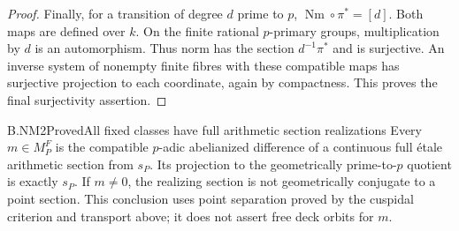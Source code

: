 \begin{proof}
Finally, for a transition of degree $d$ prime to $p$,
$\operatorname{Nm}\circ\pi^*=[d]$. Both maps are defined over
$k$. On the finite rational $p$-primary groups, multiplication by
$d$ is an automorphism. Thus norm has the section
$d^{-1}\pi^*$ and is surjective. An inverse system of nonempty
finite fibres with these compatible maps has surjective projection
to each coordinate, again by compactness. This proves the final
surjectivity assertion.
\end{proof}

\begin{claim}{B.NM2}{Proved}{All fixed classes have full arithmetic section realizations}
Every $m\in M_P^F$ is the compatible $p$-adic abelianized
difference of a continuous full étale arithmetic section from
$s_P$. Its projection to the geometrically prime-to-$p$ quotient
is exactly $s_P$. If $m\ne0$, the realizing section is not
geometrically conjugate to a point section. This conclusion uses
point separation proved by the cuspidal criterion and transport
above; it does not assert free deck orbits for $m$.
\end{claim}

